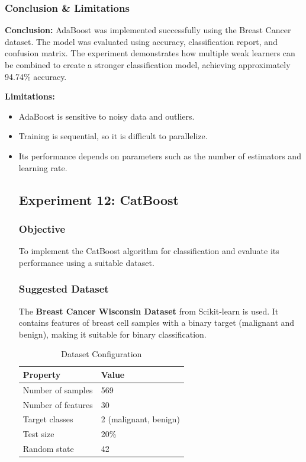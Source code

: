 \documentclass[a4paper,11pt]{article}
\begin{document}
\subsubsection{Conclusion \& Limitations}

\textbf{Conclusion:} AdaBoost was implemented successfully using the Breast Cancer dataset. The model was evaluated using accuracy, classification report, and confusion matrix. The experiment demonstrates how multiple weak learners can be combined to create a stronger classification model, achieving approximately 94.74\% accuracy.

\textbf{Limitations:}
\begin{itemize}
    \item AdaBoost is sensitive to noisy data and outliers.
    \item Training is sequential, so it is difficult to parallelize.
    \item Its performance depends on parameters such as the number of estimators and learning rate.


\subsection{Experiment 12: CatBoost}

\subsubsection{Objective}
To implement the CatBoost algorithm for classification and evaluate its performance using a suitable dataset.

\subsubsection{Suggested Dataset}
The \textbf{Breast Cancer Wisconsin Dataset} from Scikit-learn is used. It contains features of breast cell samples with a binary target (malignant and benign), making it suitable for binary classification.

\begin{table}[H]
\centering
\caption{Dataset Configuration}
\begin{tabular}{ll}
\toprule
\textbf{Property} & \textbf{Value} \\
\midrule
Number of samples  & 569 \\
Number of features & 30 \\
Target classes     & 2 (malignant, benign) \\
Test size          & 20\% \\
Random state       & 42 \\
\bottomrule
\end{tabular}
\end{table}


\end{itemize}
\end{document}
